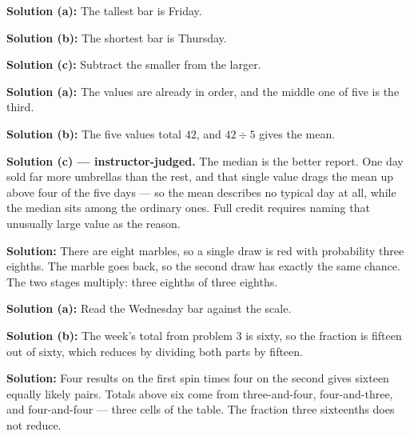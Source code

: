\documentclass[12pt]{article}
\begin{document}

\textbf{Solution (a):} \quad The tallest bar is Friday. 

\textbf{Solution (b):} \quad The shortest bar is Thursday. 

\textbf{Solution (c):} \quad Subtract the smaller from the larger. 


\textbf{Solution (a):} \quad The values are already in order, and the middle one of five is
the third. 

\textbf{Solution (b):} \quad The five values total $42$, and $42 \div 5$ gives the mean.

\textbf{Solution (c) --- instructor-judged.} \quad The median is the better report. One day
sold far more umbrellas than the rest, and that single value drags the mean up above four of
the five days --- so the mean describes no typical day at all, while the median sits among
the ordinary ones. Full credit requires naming that unusually large value as the reason.


\textbf{Solution:} \quad There are eight marbles, so a single draw is red with probability
three eighths. The marble goes back, so the second draw has exactly the same chance. The
two stages multiply: three eighths of three eighths. 


\textbf{Solution (a):} \quad Read the Wednesday bar against the scale. 

\textbf{Solution (b):} \quad The week's total from problem 3 is sixty, so the fraction is
fifteen out of sixty, which reduces by dividing both parts by fifteen.


\textbf{Solution:} \quad Four results on the first spin times four on the second gives
sixteen equally likely pairs. Totals above six come from three-and-four, four-and-three, and
four-and-four --- three cells of the table. The fraction three sixteenths does not reduce.
\end{document}
